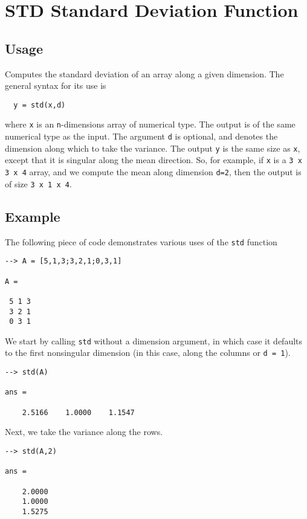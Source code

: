 \section{STD Standard Deviation Function}

\subsection{Usage}

Computes the standard deviation of an array along a given dimension.  
The general syntax for its use is
\begin{verbatim}
  y = std(x,d)
\end{verbatim}
where \verb|x| is an \verb|n|-dimensions array of numerical type.
The output is of the same numerical type as the input.  The argument
\verb|d| is optional, and denotes the dimension along which to take
the variance.  The output \verb|y| is the same size as \verb|x|, except
that it is singular along the mean direction.  So, for example,
if \verb|x| is a \verb|3 x 3 x 4| array, and we compute the mean along
dimension \verb|d=2|, then the output is of size \verb|3 x 1 x 4|.
\subsection{Example}

The following piece of code demonstrates various uses of the \verb|std|
function
\begin{verbatim}
--> A = [5,1,3;3,2,1;0,3,1]

A = 

 5 1 3 
 3 2 1 
 0 3 1 
\end{verbatim}
We start by calling \verb|std| without a dimension argument, in which 
case it defaults to the first nonsingular dimension (in this case, 
along the columns or \verb|d = 1|).
\begin{verbatim}
--> std(A)

ans = 

    2.5166    1.0000    1.1547 
\end{verbatim}
Next, we take the variance along the rows.
\begin{verbatim}
--> std(A,2)

ans = 

    2.0000 
    1.0000 
    1.5275 
\end{verbatim}
